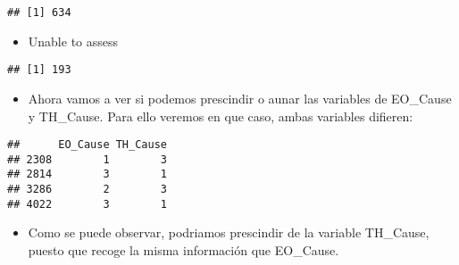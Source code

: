 \documentclass[]{article}
\providecommand{\tightlist}{%
  \setlength{\itemsep}{0pt}\setlength{\parskip}{0pt}}
\begin{document}
\begin{verbatim}
## [1] 634
\end{verbatim}

\begin{itemize}
\tightlist
\item
  Unable to assess
\end{itemize}

\begin{verbatim}
## [1] 193
\end{verbatim}

\begin{itemize}
\tightlist
\item
  Ahora vamos a ver si podemos prescindir o aunar las variables de
  EO\_Cause y TH\_Cause. Para ello veremos en que caso, ambas variables
  difieren:
\end{itemize}

\begin{verbatim}
##      EO_Cause TH_Cause
## 2308        1        3
## 2814        3        1
## 3286        2        3
## 4022        3        1
\end{verbatim}

\begin{itemize}
\tightlist
\item
  Como se puede observar, podriamos prescindir de la variable TH\_Cause,
  puesto que recoge la misma información que EO\_Cause.
\end{itemize}
\end{document}
